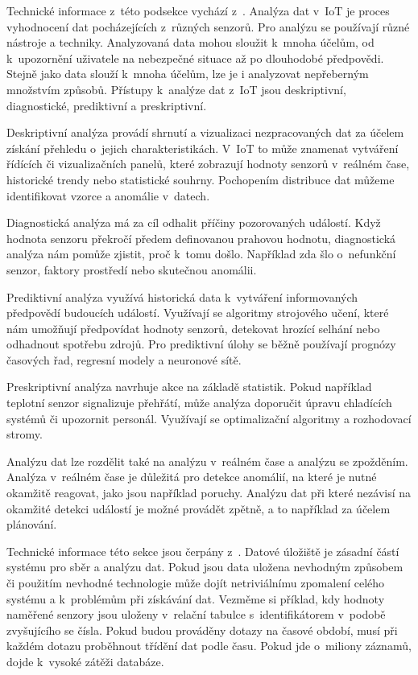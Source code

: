 Technické informace z~této podsekce vychází z~\cite{IOT_DATA_ANALYSIS}. Analýza dat v~IoT je proces vyhodnocení dat pocházejících z~různých senzorů. Pro analýzu se používají různé nástroje a techniky. Analyzovaná data mohou sloužit k~mnoha účelům, od k~upozornění uživatele na nebezpečné situace až po dlouhodobé předpovědi. Stejně jako data slouží k~mnoha účelům, lze je i analyzovat nepřeberným množstvím způsobů. Přístupy k~analýze dat z~IoT jsou deskriptivní, diagnostické, prediktivní a preskriptivní.

Deskriptivní analýza provádí shrnutí a vizualizaci nezpracovaných dat za účelem získání přehledu o~jejich charakteristikách. V~IoT to může znamenat vytváření řídících či vizualizačních panelů, které zobrazují hodnoty senzorů v~reálném čase, historické trendy nebo statistické souhrny. Pochopením distribuce dat můžeme identifikovat vzorce a anomálie v~datech.

Diagnostická analýza má za cíl odhalit příčiny pozorovaných událostí. Když hodnota senzoru překročí předem definovanou prahovou hodnotu, diagnostická analýza nám pomůže zjistit, proč k~tomu došlo. Například zda šlo o~nefunkční senzor, faktory prostředí nebo skutečnou anomálii.

Prediktivní analýza využívá historická data k~vytváření informovaných předpovědí budoucích událostí. Využívají se algoritmy strojového učení, které nám umožňují předpovídat hodnoty senzorů, detekovat hrozící selhání nebo odhadnout spotřebu zdrojů. Pro prediktivní úlohy se běžně používají prognózy časových řad, regresní modely a neuronové sítě.

Preskriptivní analýza navrhuje akce na základě statistik. Pokud například teplotní senzor signalizuje přehřátí, může analýza doporučit úpravu chladících systémů či upozornit personál. Využívají se optimalizační algoritmy a rozhodovací stromy.

Analýzu dat lze rozdělit také na analýzu v~reálném čase a analýzu se zpožděním. Analýza v~reálném čase je důležitá pro detekce anomálií, na které je nutné okamžitě reagovat, jako jsou například poruchy. Analýzu dat při které nezávisí na okamžité detekci událostí je možné provádět zpětně, a to například za účelem plánování. 

Technické informace této sekce jsou čerpány z~\cite{ted29891282time_POV6}. Datové úložiště je zásadní částí systému pro sběr a analýzu dat. Pokud jsou data uložena nevhodným způsobem či použitím nevhodné technologie může dojít netriviálnímu zpomalení celého systému a k~problémům při získávání dat. Vezměme si příklad, kdy hodnoty naměřené senzory jsou uloženy v~relační tabulce s~identifikátorem v~podobě zvyšujícího se čísla. Pokud budou prováděny dotazy na časové období, musí při každém dotazu proběhnout třídění dat podle času. Pokud jde o~miliony záznamů, dojde k~vysoké zátěži databáze.

